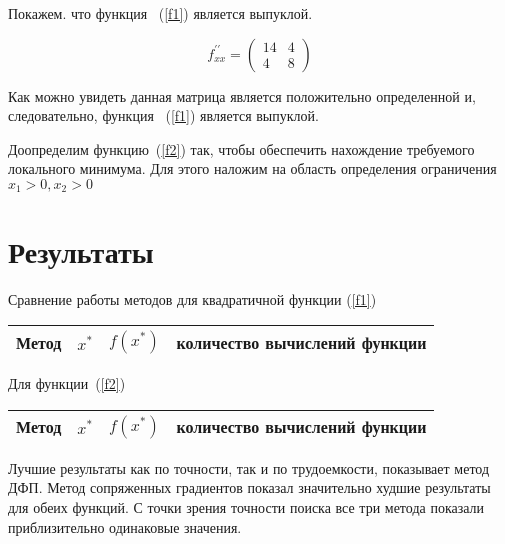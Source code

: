 \documentclass[12pt,a4paper,oneside]{report}
\begin{document}
Покажем. что функция ~(\ref{f1}) является выпуклой.

\begin{equation}
f^{\prime\prime}_{xx} =  \left( \begin{array}{cc}
	14 & 4 \\
 	  4 & 8 \end{array} \right)
\end{equation}

Как можно увидеть данная матрица является положительно определенной и, следовательно, функция ~(\ref{f1}) является выпуклой.


Доопределим функцию~(\ref{f2}) так, чтобы обеспечить нахождение требуемого локального минимума. Для этого наложим на область определения ограничения $x_{1}>0, x_{2}>0$
\section*{Результаты}
 Сравнение работы методов для квадратичной функции (\ref{f1})
\begin{center}
\begin{tabular}{||c|c|c|c||}
\hline
Метод		&	$x^{*}$	&	$f(x^{*})$  &	количество вычислений функции \\
\hline
 
\hline
 
\hline
 
\hline
 
\hline 		
\end{tabular}
\end{center}

Для функции~(\ref{f2})
\begin{center}
\begin{tabular}{||c|c|c|c||}
\hline
Метод		&	$x^{*}$	&	$f(x^{*})$  &	количество вычислений функции \\
\hline
 
\hline
 
\hline
 
\hline
 
\hline 		
\end{tabular}
\end{center} 

Лучшие результаты как по точности, так и по трудоемкости, показывает метод ДФП. Метод сопряженных градиентов показал значительно худшие результаты для обеих функций. С точки зрения точности поиска все три метода показали приблизительно одинаковые значения.
\end{document}
